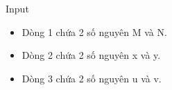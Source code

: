 Input  
\begin{itemize}
	\item     Dòng 1 chứa 2 số nguyên M và N.   
	\item     Dòng 2 chứa 2 số nguyên x và y.   
	\item     Dòng 3 chứa 2 số nguyên u và v.   
\end{itemize}